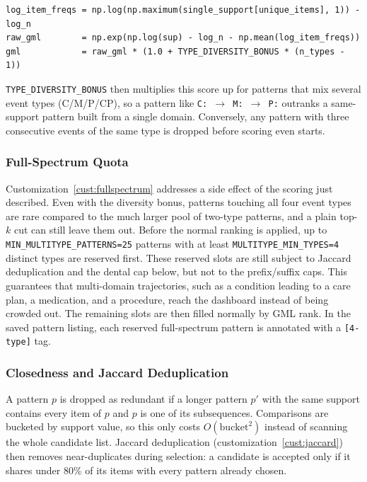 \vspace{0.25cm}

\begin{lstlisting}[style=pythonstyle]
log_item_freqs = np.log(np.maximum(single_support[unique_items], 1)) - log_n
raw_gml        = np.exp(np.log(sup) - log_n - np.mean(log_item_freqs))
gml            = raw_gml * (1.0 + TYPE_DIVERSITY_BONUS * (n_types - 1))
\end{lstlisting}

\texttt{TYPE\_DIVERSITY\_BONUS} then multiplies this score up for patterns that mix several event types (C/M/P/CP), so a pattern like \texttt{C: \(\rightarrow\) M: \(\rightarrow\) P:} outranks a same-support pattern built from a single domain. Conversely, any pattern with three consecutive events of the same type is dropped before scoring even starts.

\subsubsection*{Full-Spectrum Quota}

Customization~\ref{cust:fullspectrum} addresses a side effect of the scoring just described. Even with the diversity bonus, patterns touching all four event types are rare compared to the much larger pool of two-type patterns, and a plain top-$k$ cut can still leave them out. Before the normal ranking is applied, up to \texttt{MIN\_MULTITYPE\_PATTERNS=25} patterns with at least \texttt{MULTITYPE\_MIN\_TYPES=4} distinct types are reserved first. These reserved slots are still subject to Jaccard deduplication and the dental cap below, but not to the prefix/suffix caps. This guarantees that multi-domain trajectories, such as a condition leading to a care plan, a medication, and a procedure, reach the dashboard instead of being crowded out. The remaining slots are then filled normally by GML rank. In the saved pattern listing, each reserved full-spectrum pattern is annotated with a \texttt{[4-type]} tag.

\subsubsection*{Closedness and Jaccard Deduplication}

A pattern $p$ is dropped as redundant if a longer pattern $p'$ with the same support contains every item of $p$ and $p$ is one of its subsequences. Comparisons are bucketed by support value, so this only costs $O(\text{bucket}^2)$ instead of scanning the whole candidate list. Jaccard deduplication (customization~\ref{cust:jaccard}) then removes near-duplicates during selection: a candidate is accepted only if it shares under 80\% of its items with every pattern already chosen.

